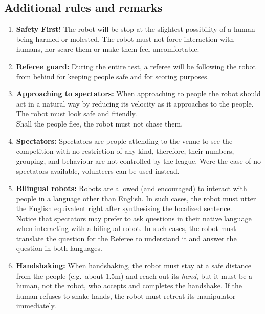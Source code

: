 \subsection{Additional rules and remarks}
\begin{enumerate}
	\item \textbf{Safety First!} The robot will be stop at the slightest possibility of a human being harmed or molested. The robot must not force interaction with humans, nor scare them or make them feel uncomfortable. \\

	\item \textbf{Referee guard:} During the entire test, a referee will be following the robot from behind for keeping people safe and for scoring purposes.\\

	\item \textbf{Approaching to spectators:} When approaching to people the robot should act in a natural way by reducing its velocity as it approaches to the people. The robot must look safe and friendly.\\

	Shall the people flee, the robot must not chase them.\\

	\item \textbf{Spectators:} Spectators are people attending to the venue to see the competition with no restriction of any kind, therefore, their numbers, grouping, and behaviour are not controlled by the league. Were the case of no spectators available, volunteers can be used instead.\\

	\item \textbf{Bilingual robots:} Robots are allowed (and encouraged) to interact with people in a language other than English. In such cases, the robot must utter the English equivalent right after synthesising the localized sentence. \\

	Notice that spectators may prefer to ask questions in their native language when interacting with a bilingual robot. In such cases, the robot must translate the question for the Referee to understand it and answer the question in both languages.\\

	\item \textbf{Handshaking:} When handshaking, the robot must stay at a safe distance from the people (e.g.~about 1.5m) and reach out its \textit{hand}, but it must be a human, not the robot, who accepts and completes the handshake. If the human refuses to shake hands, the robot must retreat its manipulator immediately.\\


\end{enumerate}
